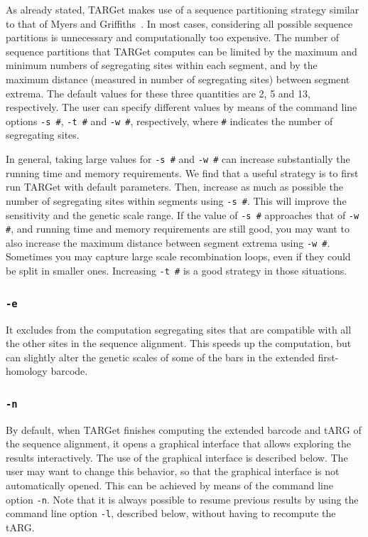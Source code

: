 \documentclass[12pt]{article}
\begin{document}
As already stated, TARGet makes use of a sequence partitioning strategy similar to that of Myers and Griffiths~\cite{mg}. In most cases, considering all possible sequence partitions is  unnecessary and computationally too expensive. The number of sequence partitions that TARGet computes can be limited by the maximum and minimum numbers of segregating sites within each segment, and by the maximum distance (measured in number of segregating sites) between segment extrema. The default values for these three quantities are 2, 5 and 13, respectively. The user can specify different values by means of the command line options \texttt{-s \#}, \texttt{-t \#} and \texttt{-w \#}, respectively, where \texttt{\#} indicates the number of segregating sites.

In general, taking large values for \texttt{-s \#} and \texttt{-w \#} can increase substantially the running time and memory requirements. We find that a useful strategy is to first run TARGet with default parameters. Then, increase as much as possible the number of segregating sites within segments using \texttt{-s \#}. This will improve the sensitivity and the genetic scale range. If the value of \texttt{-s \#} approaches that of \texttt{-w \#}, and running time and memory requirements are still good, you may want to also increase the maximum distance between segment extrema using \texttt{-w \#}. Sometimes you may capture large scale recombination loops, even if they could be split in smaller ones. Increasing \texttt{-t \#} is a good strategy in those situations.

\subsubsection*{\texttt{-e}}

It excludes from the computation segregating sites that are compatible with all the other sites in the sequence alignment. This speeds up the computation, but can slightly alter the genetic scales of some of the bars in the extended first-homology barcode.

\subsubsection*{\texttt{-n}}

By default, when TARGet finishes computing the extended barcode and tARG of the sequence alignment, it opens a graphical interface that allows exploring the results interactively. The use of the graphical interface is described below. The user may want to change this behavior, so that the graphical interface is not automatically opened. This can be achieved by means of the command line option \texttt{-n}. Note that it is always possible to resume previous results by using the command line option \texttt{-l}, described below, without having to recompute the tARG.
\end{document}
